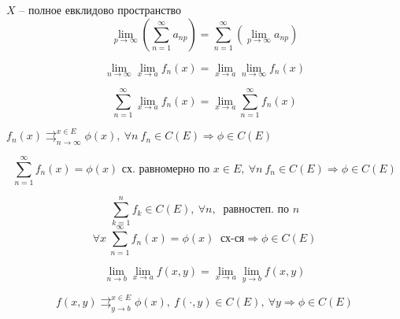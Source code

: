     \begin{corollary}
        $X$ -- полное евклидово пространство
        \[
            \lim_{p \rightarrow \infty} \left(\sum_{n=1}^\infty a_{np}\right) = \sum_{n=1}^\infty \left( \lim_{p \rightarrow \infty} a_{np}\right)
        \]
    \end{corollary}
    
    \begin{corollary}
        \[
            \lim_{n \rightarrow \infty} \lim_{x \rightarrow a} f_n(x)  = \lim_{x \rightarrow a} \lim_{n \rightarrow \infty} f_n(x)   
        \]
    \end{corollary}

    \begin{corollary}[2'] %
        \[
            \sum_{n=1}^\infty \lim_{x \rightarrow a} f_n(x) = \lim_{x \rightarrow a} \sum_{n=1}^\infty f_n(x)  
        \]
    \end{corollary}
    
    \begin{corollary}
        $f_n(x) \rightrightarrows_{n \rightarrow \infty}^{x \in E} \phi(x), \ \forall n \ f_n \in C(E) \Rightarrow \phi \in C(E)$
    \end{corollary}

    \begin{corollary}[3'] %
        \[
            \sum_{n = 1}^\infty f_n(x) = \phi(x) \text{ сх. равномерно по } x \in E, \ \forall n \ f_n \in C(E) \Rightarrow \phi \in C(E)   
        \]
    \end{corollary}

    \begin{corollary}[3''] %
        \[
            \sum_{k = 1}^n f_k \in C(E), \ \forall n, \ \text{ равностеп. по } n 
        \]
        \[
            \forall x \ \sum_{n=1}^\infty f_n(x) = \phi(x) \ \text{ сх-ся} \Rightarrow \phi \in C(E)   
        \]
    \end{corollary}

    \begin{corollary}
        \[
            \lim_{n \rightarrow b} \lim_{x \rightarrow a} f(x, y) = \lim_{x \rightarrow a} \lim_{y \rightarrow b} f(x, y)    
        \]
    \end{corollary}

    \begin{corollary}
        \[
            f(x, y) \rightrightarrows_{y \rightarrow b}^{x \in E} \phi(x), \ f(\cdot, y) \in C(E), \ \forall y \Rightarrow \phi \in C(E)  
        \]
    \end{corollary}

